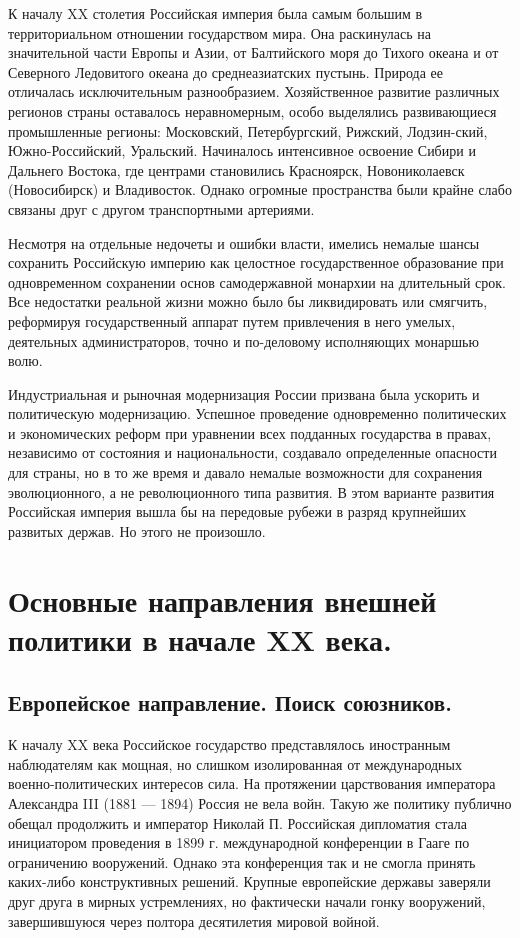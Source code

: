 \documentclass[12pt]{article}
\begin{document}
К началу XX столетия Российская империя была самым большим в территориальном отношении государством мира. Она раскинулась на значительной части Европы и Азии, от Балтийского моря до Тихого океана и от Северного Ледовитого океана до среднеазиатских пустынь. Природа ее отличалась исключительным разнообразием. Хозяйственное развитие различных регионов страны оставалось неравномерным, особо выделялись развивающиеся промышленные регионы: Московский, Петербургский, Рижский, Лодзин-ский, Южно-Российский, Уральский. Начиналось интенсивное освоение Сибири и Дальнего Востока, где центрами становились Красноярск, Новониколаевск (Новосибирск) и Владивосток. Однако огромные пространства были крайне слабо связаны друг с другом транспортными артериями.

Несмотря на отдельные недочеты и ошибки власти, имелись немалые шансы сохранить Российскую империю как целостное государственное образование при одновременном сохранении основ самодержавной монархии на длительный срок. Все недостатки реальной жизни можно было бы ликвидировать или смягчить, реформируя государственный аппарат путем привлечения в него умелых, деятельных администраторов, точно и по-деловому исполняющих монаршью волю.

Индустриальная и рыночная модернизация России призвана была ускорить и политическую модернизацию. Успешное проведение одновременно политических и экономических реформ при уравнении всех подданных государства в правах, независимо от состояния и национальности, создавало определенные опасности для страны, но в то же время и давало немалые возможности для сохранения эволюционного, а не революционного типа развития. В этом варианте развития Российская империя вышла бы на передовые рубежи в разряд крупнейших развитых держав. Но этого не произошло. 
\newpage
\section{Основные направления внешней политики в начале XX века.}
\subsection{Европейское направление. Поиск союзников.}

К началу XX века Российское государство представлялось иностранным наблюдателям как мощная, но слишком изолированная от международных военно-политических интересов сила. На протяжении царствования императора Александра III (1881 — 1894) Россия не вела войн. Такую же политику публично обещал продолжить и император Николай П. Российская дипломатия стала инициатором проведения в 1899 г. международной конференции в Гааге по ограничению вооружений. Однако эта конференция так и не смогла принять каких-либо конструктивных решений. Крупные европейские державы заверяли друг друга в мирных устремлениях, но фактически начали гонку вооружений, завершившуюся через полтора десятилетия мировой войной.
\end{document}
